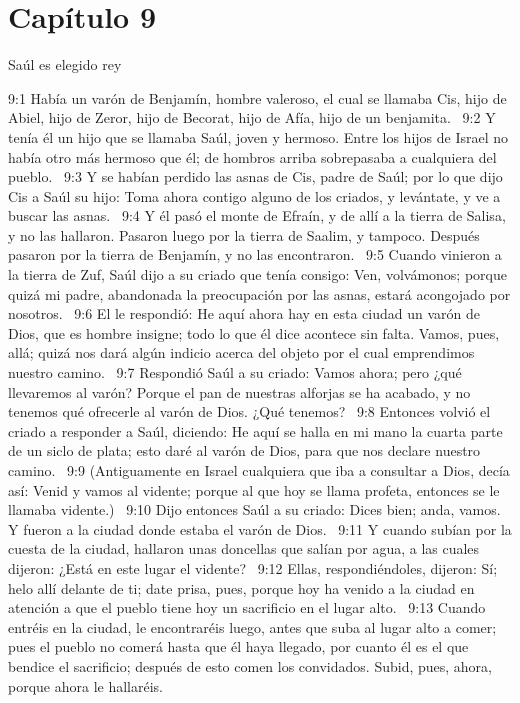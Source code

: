 \section*{Capítulo 9}
Saúl es elegido rey  

9:1 Había un varón de Benjamín, hombre valeroso, el cual se llamaba Cis, hijo de Abiel, hijo de Zeror, hijo de Becorat, hijo de Afía, hijo de un benjamita.  
9:2 Y tenía él un hijo que se llamaba Saúl, joven y hermoso. Entre los hijos de Israel no había otro más hermoso que él; de hombros arriba sobrepasaba a cualquiera del pueblo.  
9:3 Y se habían perdido las asnas de Cis, padre de Saúl; por lo que dijo Cis a Saúl su hijo: Toma ahora contigo alguno de los criados, y levántate, y ve a buscar las asnas.  
9:4 Y él pasó el monte de Efraín, y de allí a la tierra de Salisa, y no las hallaron. Pasaron luego por la tierra de Saalim, y tampoco. Después pasaron por la tierra de Benjamín, y no las encontraron.  
9:5 Cuando vinieron a la tierra de Zuf, Saúl dijo a su criado que tenía consigo: Ven, volvámonos; porque quizá mi padre, abandonada la preocupación por las asnas, estará acongojado por nosotros.  
9:6 El le respondió: He aquí ahora hay en esta ciudad un varón de Dios, que es hombre insigne; todo lo que él dice acontece sin falta. Vamos, pues, allá; quizá nos dará algún indicio acerca del objeto por el cual emprendimos nuestro camino.  
9:7 Respondió Saúl a su criado: Vamos ahora; pero ¿qué llevaremos al varón? Porque el pan de nuestras alforjas se ha acabado, y no tenemos qué ofrecerle al varón de Dios. ¿Qué tenemos?  
9:8 Entonces volvió el criado a responder a Saúl, diciendo: He aquí se halla en mi mano la cuarta parte de un siclo de plata; esto daré al varón de Dios, para que nos declare nuestro camino.  
9:9 (Antiguamente en Israel cualquiera que iba a consultar a Dios, decía así: Venid y vamos al vidente; porque al que hoy se llama profeta, entonces se le llamaba vidente.)  
9:10 Dijo entonces Saúl a su criado: Dices bien; anda, vamos. Y fueron a la ciudad donde estaba el varón de Dios.  
9:11 Y cuando subían por la cuesta de la ciudad, hallaron unas doncellas que salían por agua, a las cuales dijeron: ¿Está en este lugar el vidente?  
9:12 Ellas, respondiéndoles, dijeron: Sí; helo allí delante de ti; date prisa, pues, porque hoy ha venido a la ciudad en atención a que el pueblo tiene hoy un sacrificio en el lugar alto.  
9:13 Cuando entréis en la ciudad, le encontraréis luego, antes que suba al lugar alto a comer; pues el pueblo no comerá hasta que él haya llegado, por cuanto él es el que bendice el sacrificio; después de esto comen los convidados. Subid, pues, ahora, porque ahora le hallaréis.  
